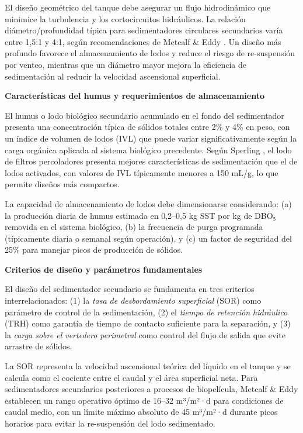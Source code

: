 \documentclass[12pt,a4paper]{article}
\begin{document}
El diseño geométrico del tanque debe asegurar un flujo hidrodinámico que minimice la turbulencia y los cortocircuitos hidráulicos. La relación diámetro/profundidad típica para sedimentadores circulares secundarios varía entre 1,5:1 y 4:1, según recomendaciones de Metcalf \& Eddy \cite{metcalf2014}. Un diseño más profundo favorece el almacenamiento de lodos y reduce el riesgo de re-suspensión por venteo, mientras que un diámetro mayor mejora la eficiencia de sedimentación al reducir la velocidad ascensional superficial.

\textbf{Características del humus y requerimientos de almacenamiento}

El humus o lodo biológico secundario acumulado en el fondo del sedimentador presenta una concentración típica de sólidos totales entre 2\% y 4\% en peso, con un índice de volumen de lodos (IVL) que puede variar significativamente según la carga orgánica aplicada al sistema biológico precedente. Según Sperling \cite{sperling2007}, el lodo de filtros percoladores presenta mejores características de sedimentación que el de lodos activados, con valores de IVL típicamente menores a 150 mL/g, lo que permite diseños más compactos.

La capacidad de almacenamiento de lodos debe dimensionarse considerando: (a) la producción diaria de humus estimada en 0,2--0,5 kg SST por kg de DBO₅ removida en el sistema biológico, (b) la frecuencia de purga programada (típicamente diaria o semanal según operación), y (c) un factor de seguridad del 25\% para manejar picos de producción de sólidos.

\textbf{Criterios de diseño y parámetros fundamentales}

El diseño del sedimentador secundario se fundamenta en tres criterios interrelacionados: (1) la \textit{tasa de desbordamiento superficial} (SOR) como parámetro de control de la sedimentación, (2) el \textit{tiempo de retención hidráulico} (TRH) como garantía de tiempo de contacto suficiente para la separación, y (3) la \textit{carga sobre el vertedero perimetral} como control del flujo de salida que evite arrastre de sólidos.

La SOR representa la velocidad ascensional teórica del líquido en el tanque y se calcula como el cociente entre el caudal y el área superficial neta. Para sedimentadores secundarios posteriores a procesos de biopelícula, Metcalf \& Eddy \cite{metcalf2014} establecen un rango operativo óptimo de 16--32 m³/m²·d para condiciones de caudal medio, con un límite máximo absoluto de 45 m³/m²·d durante picos horarios para evitar la re-suspensión del lodo sedimentado.
\end{document}
